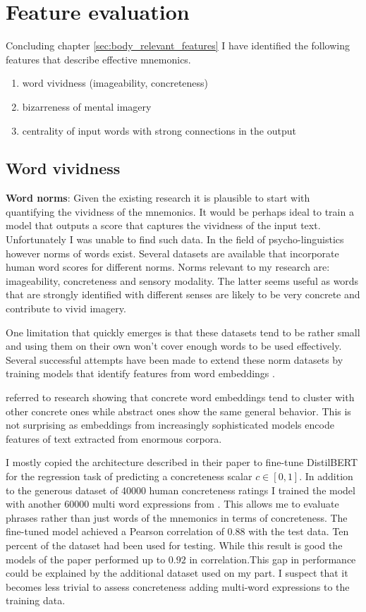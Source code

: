 \section{Feature evaluation} \label{sec:body_feature_evaluation}

Concluding chapter \ref{sec:body_relevant_features} I have identified the following features that describe effective mnemonics. 
\begin{enumerate}
    \item word vividness (imageability, concreteness)
    \item bizarreness of mental imagery
    \item centrality of input words with strong connections in the output
\end{enumerate}

\subsection{Word vividness}
\textbf{Word norms}: Given the existing research it is plausible to start with quantifying the vividness of the mnemonics. It would be perhaps ideal to train a model that outputs a score that captures the vividness of the input text. Unfortunately I was unable to find such data. In the field of psycho-linguistics however norms of words exist. Several datasets are available that incorporate human word scores for different norms. Norms relevant to my research are: imageability, concreteness and sensory modality. The latter seems useful as words that are strongly identified with different senses are likely to be very concrete and contribute to vivid imagery.

One limitation that quickly emerges is that these datasets tend to be rather small and using them on their own won't cover enough words to be used effectively. Several successful attempts have been made to extend these norm datasets by training models that identify features from word embeddings \cite{concr_embed_bert, img_concr_svm, fusing_ctx_embed_concr}.

\cite{concr_embed_bert} referred to research showing that concrete word embeddings tend to cluster with other concrete ones while abstract ones show the same general behavior. This is not surprising as embeddings from increasingly sophisticated models encode features of text extracted from enormous corpora.

I mostly copied the architecture described in their paper to fine-tune DistilBERT for the regression task of predicting a concreteness scalar $c \in [0,1]$. In addition to the generous dataset of 40000 human concreteness ratings \cite{40000_concr} I trained the model with another 60000 multi word expressions from \cite{60000_concr}. This allows me to evaluate phrases rather than just words of the mnemonics in terms of concreteness. The fine-tuned model achieved a Pearson correlation of $0.88$ with the test data. Ten percent of the dataset had been used for testing. While this result is good the models of the paper performed up to $0.92$ in correlation.This gap in performance could be explained by the additional dataset used on my part. I suspect that it becomes less trivial to assess concreteness adding multi-word expressions to the training data.

